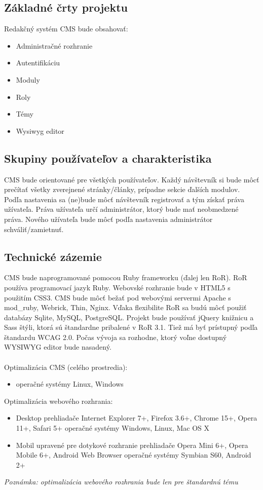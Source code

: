 \documentclass[a4paper,titlepage,11pt]{article}
\begin{document}
\subsection{Základné črty projektu}
Redakčný systém CMS bude obsahovať:
\begin{itemize}
 \item Administračné rozhranie
 \item Autentifikáciu
 \item Moduly
 \item Roly
 \item Témy
 \item Wysiwyg editor
\end{itemize}

\subsection{Skupiny používateľov a charakteristika}
CMS bude orientované pre všetkých používateľov. 
Každý návštevník si bude môcť prečítať všetky zverejnené stránky\slash články, prípadne sekcie ďalších modulov. 
Podľa nastavenia sa (ne)bude môcť návštevník registrovať a tým získať práva užívateľa. 
Práva užívateľa určí administrátor, ktorý bude mať neobmedzené práva. 
Nového užívateľa bude môcť podľa nastavenia administrátor schváliť\slash zamietnuť.

\subsection{Technické zázemie}
CMS bude naprogramované pomocou Ruby frameworku  (ďalej len RoR). 
RoR používa programovací jazyk Ruby. Webovské rozhranie bude v HTML5 s použitím CSS3.
CMS bude môcť bežať pod webovými servermi Apache s mod\_ruby, Webrick, Thin, Nginx.
Vďaka flexibilite RoR sa budú môcť použiť databázy Sqlite, MySQL, PostgreSQL.
Projekt bude používať jQuery knižnicu a Sass štýli, ktorá sú štandardne pribalené v RoR 3.1. 
Tiež má byť prístupný podľa štandardu WCAG 2.0. Počas vývoja sa rozhodne, ktorý voľne dostupný WYSIWYG editor bude nasadený.\\
\\
Optimalizácia CMS (celého prostredia):
\begin{itemize}
 \item operačné systémy Linux, Windows
\end{itemize}
Optimalizácia webového rozhrania:
\begin{itemize}
 \item Desktop
  \subitem prehliadače Internet Explorer 7+, Firefox 3.6+, Chrome 15+, Opera 11+, Safari 5+
  \subitem operačné systémy Windows, Linux, Mac OS X
 \item Mobil
  \subitem upravené pre dotykové rozhranie
  \subitem prehliadače Opera Mini 6+, Opera Mobile 6+, Android Web Browser
  \subitem operačné systémy Symbian S60, Android 2+
\end{itemize}
\emph{Poznámka: optimalizácia webového rozhrania bude len pre štandardnú tému}
\end{document}
